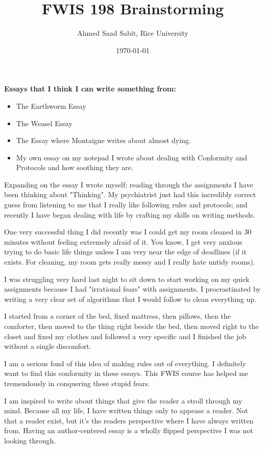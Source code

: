 \documentclass[letter]{article}
\title{FWIS 198 Brainstorming}
\author{Ahmed Saad Sabit, Rice University}
\date{\today}
\begin{document}
\maketitle

\textbf{Essays that I think I can write something from:}
\begin{itemize}
	\item The Earthworm Essay
	\item The Weasel Essay
	\item The Essay where Montaigne writes about almost dying. 
	\item My own essay on my notepad I wrote about dealing with Conformity and Protocols and how soothing they are. 
\end{itemize}

Expanding on the essay I wrote myself; reading through the assignments I have been thinking about "Thinking". My psychiatrist just had this incredibly correct guess from listening to me that I really like following rules and protocols; and recently I have began dealing with life by crafting my skills on writing methods. 

One very successful thing I did recently was I could get my room cleaned in 30 minutes without feeling extremely afraid of it. You know, I get very anxious trying to do basic life things unless I am very near the edge of deadlines (if it exists. For cleaning, my room gets really messy and I really hate untidy rooms).

I was struggling very hard last night to sit down to start working on my quick assignments because I had "irrational fears" with assignments. I procrastinated by writing a very clear set of algorithms that I would follow to clean everything up. 

I started from a corner of the bed, fixed mattress, then pillows, then the comforter, then moved to the thing right beside the bed, then moved right to the closet and fixed my clothes and followed a very specific and I finished the job without a single discomfort. 

I am a serious fond of this idea of making rules out of everything. I definitely want to find this conformity in these essays. This FWIS course has helped me tremendously in conquering these stupid fears. 

I am inspired to write about things that give the reader a stroll through my mind. Because all my life, I have written things only to appease a reader. Not that a reader exist, but it's the readers perspective where I have always written from. Having an author-centered essay is a wholly flipped perspective I was not looking through. 
\end{document}
